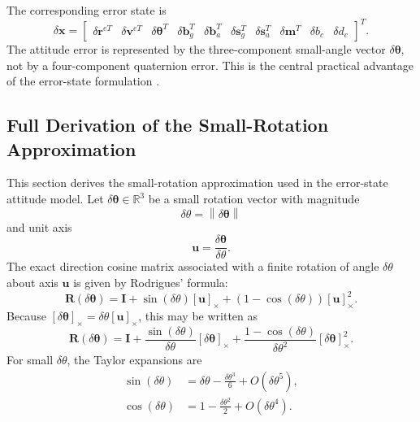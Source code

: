 \documentclass[11pt,oneside]{book}
\newcommand{\R}{\mathbb{R}}
\renewcommand{\skew}[1]{\left[#1\right]_{\times}}
\newcommand{\deltax}{\delta \mathbf{x}}
\newcommand{\vb}{\mathbf{v}}
\newcommand{\rb}{\mathbf{r}}
\newcommand{\bb}{\mathbf{b}}
\newcommand{\I}{\mathbf{I}}
\newcommand{\norm}[1]{\left\lVert #1 \right\rVert}
\begin{document}
The corresponding error state is
\begin{equation}
\deltax =
\begin{bmatrix}
\delta\rb^{eT} &
\delta\vb^{eT} &
\delta\boldsymbol\theta^{T} &
\delta\bb_{g}^{T} &
\delta\bb_{a}^{T} &
\delta\mathbf{s}_{g}^{T} &
\delta\mathbf{s}_{a}^{T} &
\delta\mathbf{m}^{T} &
\delta b_c &
\delta d_c
\end{bmatrix}^{T}.
\label{eq:error_state_ch1}
\end{equation}
The attitude error is represented by the three-component small-angle vector \(\delta\boldsymbol\theta\), not by a four-component quaternion error. This is the central practical advantage of the error-state formulation \cite{groves2013,titterton2004,sola2018}.

\subsection{Full Derivation of the Small-Rotation Approximation}
This section derives the small-rotation approximation used in the error-state attitude model. Let \(\delta\boldsymbol\theta \in \R^3\) be a small rotation vector with magnitude
\begin{equation}
\delta\theta = \norm{\delta\boldsymbol\theta}
\end{equation}
and unit axis
\begin{equation}
\mathbf{u} = \frac{\delta\boldsymbol\theta}{\delta\theta}.
\end{equation}
The exact direction cosine matrix associated with a finite rotation of angle \(\delta\theta\) about axis \(\mathbf{u}\) is given by Rodrigues' formula:
\begin{equation}
\mathbf{R}(\delta\boldsymbol\theta)
= \I + \sin(\delta\theta)\skew{\mathbf{u}}
+ \left(1-\cos(\delta\theta)\right)\skew{\mathbf{u}}^2.
\label{eq:rodrigues_axis_angle}
\end{equation}
Because \(\skew{\delta\boldsymbol\theta}=\delta\theta\skew{\mathbf{u}}\), this may be written as
\begin{equation}
\mathbf{R}(\delta\boldsymbol\theta)
= \I
+ \frac{\sin(\delta\theta)}{\delta\theta}\skew{\delta\boldsymbol\theta}
+ \frac{1-\cos(\delta\theta)}{\delta\theta^2}\skew{\delta\boldsymbol\theta}^{2}.
\label{eq:rodrigues_rotation_vector}
\end{equation}
For small \(\delta\theta\), the Taylor expansions are
\begin{align}
\sin(\delta\theta) &= \delta\theta - \frac{\delta\theta^3}{6} + O(\delta\theta^5),\\
\cos(\delta\theta) &= 1 - \frac{\delta\theta^2}{2} + O(\delta\theta^4).
\end{align}
\end{document}
